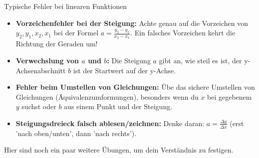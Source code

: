 \begin{fehlerboxumgebung}{Typische Fehler bei linearen Funktionen}
\begin{itemize}
    \item \textbf{Vorzeichenfehler bei der Steigung:} Achte genau auf die Vorzeichen von $y_2, y_1, x_2, x_1$ bei der Formel $a = \frac{y_2-y_1}{x_2-x_1}$. Ein falsches Vorzeichen kehrt die Richtung der Geraden um!
    \item \textbf{Verwechslung von $a$ und $b$:} Die Steigung $a$ gibt an, wie steil es ist, der y-Achsenabschnitt $b$ ist der Startwert auf der y-Achse.
    \item \textbf{Fehler beim Umstellen von Gleichungen:} Übe das sichere Umstellen von Gleichungen (Äquivalenzumformungen), besonders wenn du $x$ bei gegebenem $y$ suchst oder $b$ aus einem Punkt und der Steigung.
    \item \textbf{Steigungsdreieck falsch ablesen/zeichnen:} Denke daran: $a = \frac{\Delta y}{\Delta x}$ (erst 'nach oben/unten', dann 'nach rechts').
\end{itemize}
\end{fehlerboxumgebung}

Hier sind noch ein paar weitere Übungen, um dein Verständnis zu festigen.

